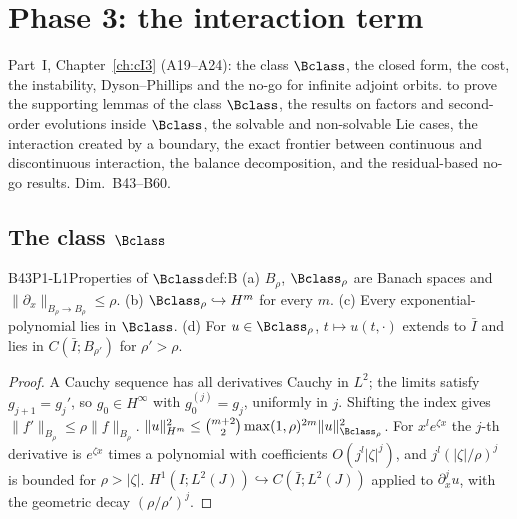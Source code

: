\chapter{Phase 3: the interaction term}\label{ch:cII3}
\chapterbrief
{Part~I, Chapter~\ref{ch:cI3} (A19--A24): the class $\Bclass$, the closed form, the cost, the instability, Dyson--Phillips and the no-go for infinite adjoint orbits.}
{to prove the supporting lemmas of the class $\Bclass$, the results on factors and second-order evolutions inside $\Bclass$, the solvable and non-solvable Lie cases, the interaction created by a boundary, the exact frontier between continuous and discontinuous interaction, the balance decomposition, and the residual-based no-go results.}
{Dim.~B43--B60.}

\section{The class $\Bclass$}

\begin{dimcard}{B43}{P1-L1}{Properties of $\Bclass$}{\proved}{def:B}
(a) $B_\rho$, $\Bclass_\rho$ are Banach spaces and $\|\partial_x\|_{B_\rho\to B_\rho}\le\rho$. (b) $\Bclass_\rho\hookrightarrow H^m$ for every $m$. (c) Every exponential-polynomial lies in $\Bclass$. (d) For $u\in\Bclass_\rho$, $t\mapsto u(t,\cdot)$ extends to $\bar I$ and lies in $C(\bar I;B_{\rho'})$ for $\rho'>\rho$.
\end{dimcard}
\begin{proof}
A Cauchy sequence has all derivatives Cauchy in $L^2$; the limits satisfy $g_{j+1}=g_j'$, so $g_0\in H^\infty$ with $g_0^{(j)}=g_j$, uniformly in $j$. Shifting the index gives $\|f'\|_{B_\rho}\le\rho\|f\|_{B_\rho}$.
$\|u\|_{H^m}^2\le\binom{m+2}{2}\max(1,\rho)^{2m}\|u\|_{\Bclass_\rho}^2$. For $x^le^{\zeta x}$ the $j$-th derivative is $e^{\zeta x}$ times a polynomial with coefficients $O(j^l|\zeta|^j)$, and $j^l(|\zeta|/\rho)^j$ is bounded for $\rho>|\zeta|$.
$H^1(I;L^2(J))\hookrightarrow C(\bar I;L^2(J))$ applied to $\partial_x^ju$, with the geometric decay $(\rho/\rho')^j$.
\end{proof}

